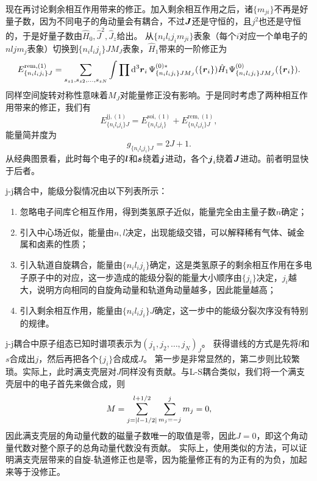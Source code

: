 现在再讨论剩余相互作用带来的修正。加入剩余相互作用之后，诸$\{m_{ji}\}$不再是好量子数，因为不同电子的角动量会有耦合，不过$\vb*{J}$还是守恒的，且$j^2$也还是守恒的，于是好量子数由$\hat{H}_0, \hat{J}^2, \hat{J}_z$给出。
从$\{n_i l_i j_i m_{ji}\}$表象（每个$i$对应一个单电子的$nl j m_j$表象）切换到$\{n_i l_i j_i\} J M_J$表象，$\hat{H}_1$带来的一阶修正为
\begin{equation}
    E^{\text{rem}, (1)}_{\{n_i l_i j_i\} J} = \sum_{s_{z1}, s_{z2}, \ldots, s_{zN}} \int \prod \dd[3]{\vb*{r}_i} \Psi^{(0) *}_{\{n_i l_i j_i\} J M_J}(\{\vb*{r}_i\}) \hat{H}_1 \Psi^{(0)}_{\{n_i l_i j_i\} J M_J}(\{\vb*{r}_i\}).
\end{equation}
同样空间旋转对称性意味着$M_J$对能量修正没有影响。于是同时考虑了两种相互作用带来的修正，我们有
\begin{equation}
    E^{\text{jj}, (1)}_{\{n_i l_i j_i\} J} = E^{\text{soi}, (1)}_{\{n_i l_i j_i\}} + E^{\text{rem}, (1)}_{\{n_i l_i j_i\} J},
\end{equation}
能量简并度为
\begin{equation}
    g_{\{n_i l_i j_i\}J} = 2J+1.
\end{equation}
从经典图景看，此时每个电子的$\vb*{l}$和$\vb*{s}$绕着$\vb*{j}$进动，各个$\vb*{j}_i$绕着$\vb*{J}$进动。前者明显快于后者。

j-j耦合中，能级分裂情况由以下列表所示：
\begin{enumerate}
    \item 忽略电子间库仑相互作用，得到类氢原子近似，能量完全由主量子数$n$确定；
    \item 引入中心场近似，能量由$n, l$决定，出现能级交错，可以解释稀有气体、碱金属和卤素的性质；
    \item 引入轨道自旋耦合，能量由$\{n_i l_i j_i\}$确定，这是类氢原子的剩余相互作用在多电子原子中的对应，这一步造成的能级分裂的能量大小顺序由$\{j_i\}$决定，$j_i$越大，说明方向相同的自旋角动量和轨道角动量越多，因此能量越高；
    \item 引入剩余相互作用，能量由$\{n_i l_i j_i\} J$确定，这一步中的能级分裂次序没有特别的规律。
\end{enumerate}

j-j耦合中原子组态已知时谱项表示为$(j_1, j_2, \ldots, j_N)_J$。
获得谱线的方式是先将$l$和$s$合成出$j$，然后再把各个$\{j_i\}$合成成$J$。
第一步是非常显然的，第二步则比较繁琐。实际上，此时满支壳层对$J$同样没有贡献。与L-S耦合类似，我们将一个满支壳层中的电子首先来做合成，则
\[
    M = \sum_{j=\abs{l-1/2}}^{l+1/2} \sum_{m_j=-j}^j m_j = 0,
\]
因此满支壳层的角动量代数的磁量子数唯一的取值是零，因此$J=0$，即这个角动量代数对整个原子的总角动量代数没有贡献。
实际上，使用类似的方法，可以证明满支壳层带来的自旋-轨道修正也是零，因为能量修正有的为正有的为负，加起来等于没修正。


